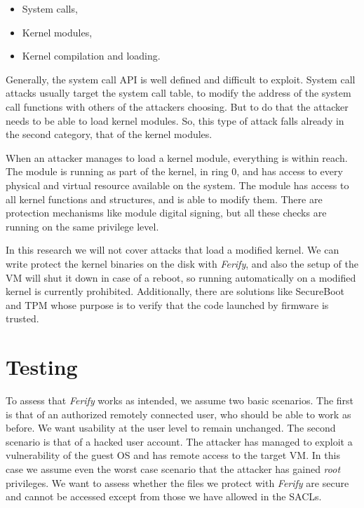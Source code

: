 \begin{itemize}
	\item System calls,
	\item Kernel modules,
	\item Kernel compilation and loading.
\end{itemize}

\par Generally, the system call \ac{API} is well defined and difficult to exploit. System call attacks usually target the system call table, to modify the address of the system call functions with others of the attackers choosing. But to do that the attacker needs to be able to load kernel modules. So, this type of attack falls already in the second category, that of the kernel modules.

\par When an attacker manages to load a kernel module, everything is within reach. The module is running as part of the kernel, in ring 0, and has access to every physical and virtual resource available on the system. The module has access to all kernel functions and structures, and is able to modify them. There are protection mechanisms like module digital signing, but all these checks are running on the same privilege level.

\par In this research we will not cover attacks that load a modified kernel. We can write protect the kernel binaries on the disk with \emph{Ferify}, and also the setup of the \ac{VM} will shut it down in case of a reboot, so running automatically on a modified kernel is currently prohibited. Additionally, there are solutions like SecureBoot and TPM whose purpose is to verify that the code launched by firmware is trusted.

 

\section{Testing}\label{sec:testing}

\par To assess that \emph{Ferify} works as intended, we assume two basic scenarios. The first is that of an authorized remotely connected user, who should be able to work as before. We want usability at the user level to remain unchanged. The second scenario is that of a hacked user account. The attacker has managed to exploit a vulnerability of the guest \ac{OS} and has remote access to the target \ac{VM}. In this case we assume even the worst case scenario that the attacker has gained \emph{root} privileges. We want to assess whether the files we protect with \emph{Ferify} are secure and cannot be accessed except from those we have allowed in the \acp{SACL}.


